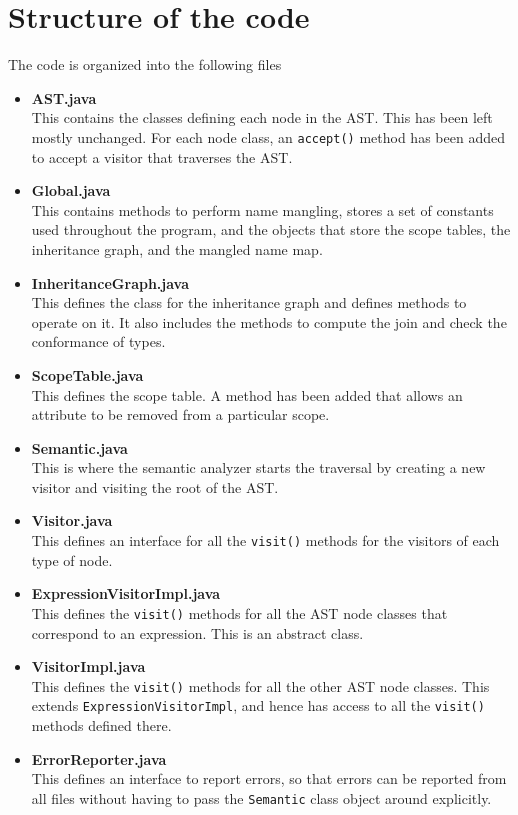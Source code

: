 \documentclass{article}
\begin{document}
\section{Structure of the code}
The code is organized into the following files
\begin{itemize}
	\item \textbf{AST.java} \\
	This contains the classes defining each node in the AST. This has been left mostly unchanged. For each node class, an \verb|accept()| method has been added to accept a visitor that traverses the AST.
	\item \textbf{Global.java} \\
	This contains methods to perform name mangling, stores a set of constants used throughout the program, and the objects that store the scope tables, the inheritance graph, and the mangled name map.
	\item \textbf{InheritanceGraph.java} \\
	This defines the class for the inheritance graph and defines methods to operate on it. It also includes the methods to compute the join and check the conformance of types.
	\item \textbf{ScopeTable.java} \\
	This defines the scope table. A method has been added that allows an attribute to be removed from a particular scope.
	\item \textbf{Semantic.java} \\
	This is where the semantic analyzer starts the traversal by creating a new visitor and visiting the root of the AST.
	\item \textbf{Visitor.java} \\
	This defines an interface for all the \verb|visit()| methods for the visitors of each type of node.
	\item \textbf{ExpressionVisitorImpl.java} \\
	This defines the \verb|visit()| methods for all the AST node classes that correspond to an expression. This is an abstract class.
	\item \textbf{VisitorImpl.java} \\
	This defines the \verb|visit()| methods for all the other AST node classes. This extends \verb|ExpressionVisitorImpl|, and hence has access to all the \verb|visit()| methods defined there.
	\item \textbf{ErrorReporter.java} \\
	This defines an interface to report errors, so that errors can be reported from all files without having to pass the \verb|Semantic| class object around explicitly.
\end{itemize}
\end{document}
